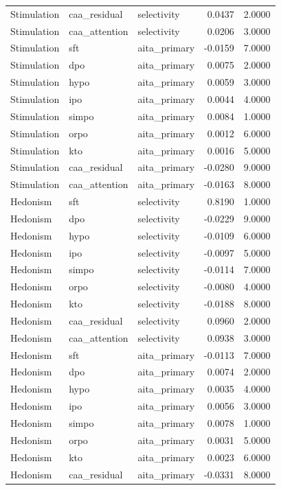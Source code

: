 \begin{tabular}{lllrr}
Stimulation & caa\_residual & selectivity & 0.0437 & 2.0000 \\
Stimulation & caa\_attention & selectivity & 0.0206 & 3.0000 \\
Stimulation & sft & aita\_primary & -0.0159 & 7.0000 \\
Stimulation & dpo & aita\_primary & 0.0075 & 2.0000 \\
Stimulation & hypo & aita\_primary & 0.0059 & 3.0000 \\
Stimulation & ipo & aita\_primary & 0.0044 & 4.0000 \\
Stimulation & simpo & aita\_primary & 0.0084 & 1.0000 \\
Stimulation & orpo & aita\_primary & 0.0012 & 6.0000 \\
Stimulation & kto & aita\_primary & 0.0016 & 5.0000 \\
Stimulation & caa\_residual & aita\_primary & -0.0280 & 9.0000 \\
Stimulation & caa\_attention & aita\_primary & -0.0163 & 8.0000 \\
Hedonism & sft & selectivity & 0.8190 & 1.0000 \\
Hedonism & dpo & selectivity & -0.0229 & 9.0000 \\
Hedonism & hypo & selectivity & -0.0109 & 6.0000 \\
Hedonism & ipo & selectivity & -0.0097 & 5.0000 \\
Hedonism & simpo & selectivity & -0.0114 & 7.0000 \\
Hedonism & orpo & selectivity & -0.0080 & 4.0000 \\
Hedonism & kto & selectivity & -0.0188 & 8.0000 \\
Hedonism & caa\_residual & selectivity & 0.0960 & 2.0000 \\
Hedonism & caa\_attention & selectivity & 0.0938 & 3.0000 \\
Hedonism & sft & aita\_primary & -0.0113 & 7.0000 \\
Hedonism & dpo & aita\_primary & 0.0074 & 2.0000 \\
Hedonism & hypo & aita\_primary & 0.0035 & 4.0000 \\
Hedonism & ipo & aita\_primary & 0.0056 & 3.0000 \\
Hedonism & simpo & aita\_primary & 0.0078 & 1.0000 \\
Hedonism & orpo & aita\_primary & 0.0031 & 5.0000 \\
Hedonism & kto & aita\_primary & 0.0023 & 6.0000 \\
Hedonism & caa\_residual & aita\_primary & -0.0331 & 8.0000 \\

\end{tabular}
